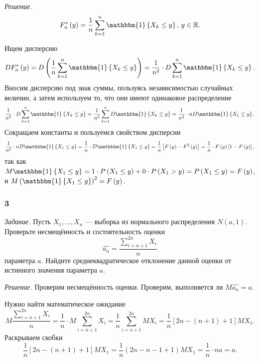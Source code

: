 \textit{Решение.}
$$F_n^* \left( y \right) =
  \frac{1}{n} \sum \limits_{k = 1}^n \mathbbm{1} \left\{ X_k \leq y \right\}, \,
  y \in \mathbb{R}.$$

Ищем дисперсию
$$DF_n^* \left( y \right) =
  D \left( \frac{1}{n} \sum \limits_{k = 1}^n \mathbbm{1} \left\{ X_k \leq y \right\} \right) =
  \frac{1}{n^2} \cdot D \sum \limits_{k = 1}^n \mathbbm{1} \left\{ X_k \leq y \right\}.$$
Вносим дисперсию под знак суммы, пользуясь независимостью случайных величин, а затем используем то,
что они имеют одинаковое распределение
$$ \frac{1}{n^2} \cdot D \sum \limits_{k = 1}^n \mathbbm{1} \left\{ X_k \leq y \right\} =
  \frac{1}{n^2} \sum \limits_{k = 1}^n D \mathbbm{1} \left\{ X_k \leq y \right\} =
  \frac{1}{n^2} \cdot nD \mathbbm{1} \left\{ X_1 \leq y \right\}.$$
Сокращаем константы и пользуемся свойством дисперсии
$$ \frac{1}{n^2} \cdot nD \mathbbm{1} \left\{ X_1 \leq y \right\} =
  \frac{1}{n} \cdot D \mathbbm{1} \left\{ X_1 \leq y \right\} =
  \frac{1}{n} \left[ F \left( y \right) - F^2 \left( y \right) \right] =
  \frac{1}{n} \cdot F \left( y \right) \left[ 1 - F \left( y \right) \right],$$
так как
$M \mathbbm{1} \left\{ X_1 \leq y \right\} =
  1 \cdot P \left( X_1 \leq y \right) + 0 \cdot P \left( X_1 > y \right) =
  P \left( X_1 \leq y \right) =
  F \left( y \right) $,
и $M \left( \mathbbm{1} \left\{ X_1 \leq y \right\} \right)^2 = F \left( y \right) $.

\subsubsection*{3}

\textit{Задание.}
Пусть $X_1, \dotsc, X_n$ --- выборка из нормального распределения $N \left( a, 1 \right) $.
Проверьте несмещённость и состоятельность оценки
$$ \hat{a_n} =
  \frac{ \sum \limits_{i = n + 1}^{2n} X_i}{n}$$
параметра $a$.
Найдите среднеквадратическое отклонение данной оценки от истинного значения параметра $a$.

\textit{Решение.} Проверим несмещённость оценки.
Проверим, выполняется ли $M \hat{a_n} = a$.

Нужно найти математическое ожидание
$$M \frac{ \sum \limits_{i = n + 1}^{2n} X_i}{n} =
  \frac{1}{n} \cdot M \sum \limits_{i = n + 1}^{2n} X_i =
  \frac{1}{n} \sum \limits_{i = n + 1}^{2n} MX_i =
  \frac{1}{n} \left[ 2n - \left( n + 1 \right) + 1 \right] MX_1.$$
Раскрываем скобки
$$ \frac{1}{n} \left[ 2n - \left( n + 1 \right) + 1 \right] MX_1 =
  \frac{1}{n} \left( 2n - n - 1 + 1 \right) MX_1 =
  \frac{1}{n} \cdot na =
  a.$$

